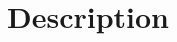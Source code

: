 \documentclass[11pt]{article}
\begin{document}
\section*{Description}
	





	
















\end{document}
